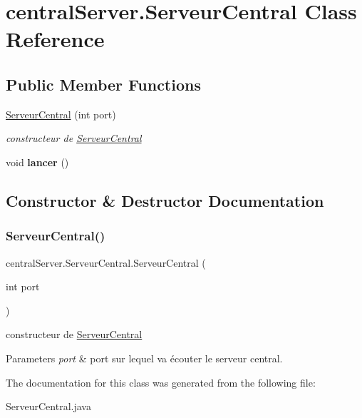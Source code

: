 \hypertarget{classcentralServer_1_1ServeurCentral}{}\section{central\+Server.\+Serveur\+Central Class Reference}
\label{classcentralServer_1_1ServeurCentral}
\subsection*{Public Member Functions}
\begin{DoxyCompactItemize}
\item 
\hyperlink{classcentralServer_1_1ServeurCentral_a0a086fea144fda9d64564199aa9de857}{Serveur\+Central} (int port)
\begin{DoxyCompactList}\small\item\em constructeur de \hyperlink{classcentralServer_1_1ServeurCentral}{Serveur\+Central} \end{DoxyCompactList}\item 
\mbox{\label{classcentralServer_1_1ServeurCentral_a48440e395e1ad3a3c4eca13ca4245bd5}} 
void {\bfseries lancer} ()
\end{DoxyCompactItemize}


\subsection{Constructor \& Destructor Documentation}
\mbox{\label{classcentralServer_1_1ServeurCentral_a0a086fea144fda9d64564199aa9de857}} 
\subsubsection{\texorpdfstring{Serveur\+Central()}{ServeurCentral()}}
{\footnotesize\ttfamily central\+Server.\+Serveur\+Central.\+Serveur\+Central (\begin{DoxyParamCaption}\item[{int}]{port }\end{DoxyParamCaption})\hspace{0.3cm}{\ttfamily [inline]}}



constructeur de \hyperlink{classcentralServer_1_1ServeurCentral}{Serveur\+Central} 


\begin{DoxyParams}{Parameters}
{\em port} & port sur lequel va écouter le serveur central. \\
\hline
\end{DoxyParams}


The documentation for this class was generated from the following file\+:\begin{DoxyCompactItemize}
\item 
Serveur\+Central.\+java\end{DoxyCompactItemize}
